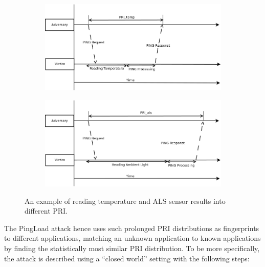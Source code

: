 \begin{figure}[ht!]
	\center
	\begin{subfigure}{0.8\textwidth}
	{
		\center
		\includegraphics[width=\textwidth]{fig/PingLoad_temperature.png}
	}
	\end{subfigure}
	\begin{subfigure}{0.8\textwidth}
	{
		\center
		\includegraphics[width=\textwidth]{fig/PingLoad_als.png}
	}
	\end{subfigure}
	\caption{An example of reading temperature and ALS sensor results into different PRI.}
	\label{PingLoadTheory}
\end{figure}

The PingLoad attack hence uses such prolonged PRI distributions as fingerprints to different applications, matching an unknown application to known applications by finding  the statistically most similar PRI distribution. To be more specifically, the attack is described using a ``closed world'' setting with the following steps:

